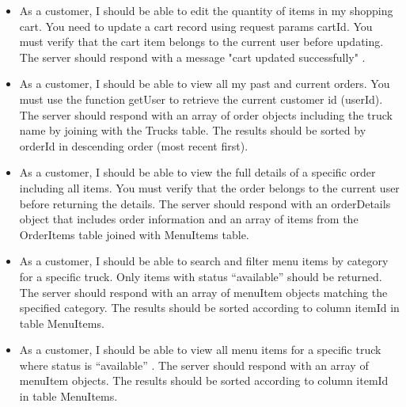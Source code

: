 \documentclass[12pt,a4paper]{article}
\begin{document}
\begin{storybox}
\begin{itemize}[leftmargin=1em, itemsep=6pt]
    \item As a customer, I should be able to edit the quantity of items in my shopping cart. You need to update a cart record using request params cartId. You must verify that the cart item belongs to the current user before updating. The server should respond with a message "cart updated successfully" .
    \item As a customer, I should be able to view all my past and current orders. You must use the function getUser to retrieve the current customer id (userId). The server should respond with an array of order objects including the truck name by joining with the Trucks table. The results should be sorted by orderId in descending order (most recent first).
    \item As a customer, I should be able to view the full details of a specific order including all items. You must verify that the order belongs to the current user before returning the details. The server should respond with an orderDetails object that includes order information and an array of items from the OrderItems table joined with MenuItems table.
    \item As a customer, I should be able to search and filter menu items by category for a specific truck. Only items with status “available” should be returned. The server should respond with an array of menuItem objects matching the specified category. The results should be sorted according to column itemId in table MenuItems.
    \item As a customer, I should be able to view all menu items for a specific truck where status is “available” . The server should respond with an array of menuItem objects. The results should be sorted according to column itemId in table MenuItems.    
    
\end{itemize}
\end{storybox}

\vspace{1em}
\end{document}
